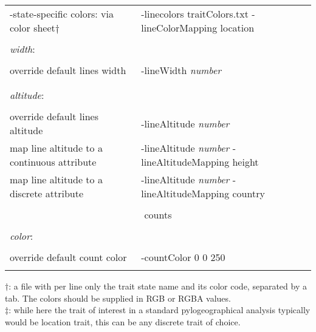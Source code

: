 \documentclass[english]{paper}
\begin{document}
\begin{table}[!ht]
\begin{tabular}{ll}
	-state-specific colors: via color sheet$\dagger$&-linecolors traitColors.txt -lineColorMapping location		\\
								&						\\
\textit{width}:					&						\\
								&						\\
	override default lines width		&-lineWidth \textit{number}	\\
								&						\\
								&						\\
\textit{altitude}:				&						\\
								&						\\
override default lines altitude			&-lineAltitude  \textit{number}	\\
map line altitude to a continuous attribute	&-lineAltitude  \textit{number} -lineAltitudeMapping height	\\
map line altitude to a discrete attribute	&-lineAltitude  \textit{number} -lineAltitudeMapping country\\
								&						\\
\midrule
			\multicolumn{2}{c}{counts}				\\
\midrule
								&						\\
\textit{color}:					&						\\
								&						\\
override default count color			&	-countColor 0 0 250		\\
								&						\\
\bottomrule
\end{tabular}
\begin{flushleft}
{\footnotesize 
$\dagger$: a file with per line only the trait state name and its color code, separated by a tab. The colors should be supplied in RGB or RGBA values.
\\
$\ddagger$: while here the trait of interest in a standard pylogeographical analysis  typically would be location trait, this can be any discrete trait of choice.
} 
\end{flushleft}
\label{tab:options}
 \end{table}
\end{document}

